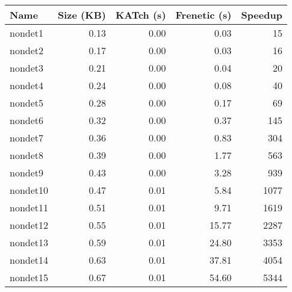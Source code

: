 \begin{tabular}{lrrrr}
\toprule
Name & Size (KB) & KATch (s) & Frenetic (s) & Speedup \\
\midrule
nondet1 & 0.13 & 0.00 & 0.03 & 15 \\
nondet2 & 0.17 & 0.00 & 0.03 & 16 \\
nondet3 & 0.21 & 0.00 & 0.04 & 20 \\
nondet4 & 0.24 & 0.00 & 0.08 & 40 \\
nondet5 & 0.28 & 0.00 & 0.17 & 69 \\
nondet6 & 0.32 & 0.00 & 0.37 & 145 \\
nondet7 & 0.36 & 0.00 & 0.83 & 304 \\
nondet8 & 0.39 & 0.00 & 1.77 & 563 \\
nondet9 & 0.43 & 0.00 & 3.28 & 939 \\
nondet10 & 0.47 & 0.01 & 5.84 & 1077 \\
nondet11 & 0.51 & 0.01 & 9.71 & 1619 \\
nondet12 & 0.55 & 0.01 & 15.77 & 2287 \\
nondet13 & 0.59 & 0.01 & 24.80 & 3353 \\
nondet14 & 0.63 & 0.01 & 37.81 & 4054 \\
nondet15 & 0.67 & 0.01 & 54.60 & 5344 \\
\bottomrule
\end{tabular}
